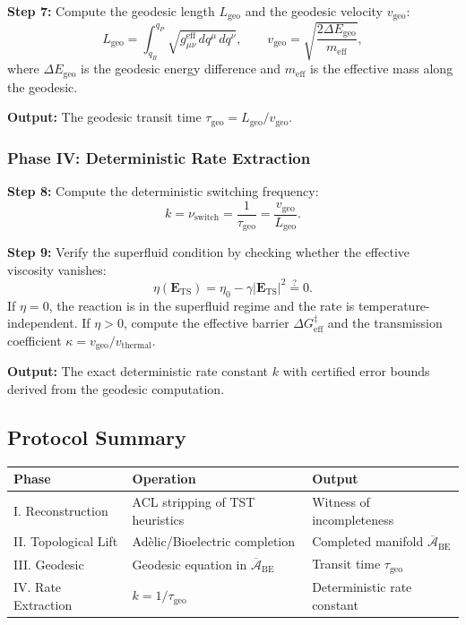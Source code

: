 \documentclass[11pt,openany]{extbook}
\theoremstyle{plain}
\theoremstyle{definition}
\begin{document}
\noindent \textbf{Step 7:} Compute the geodesic length $L_{\mathrm{geo}}$ and the geodesic velocity $v_{\mathrm{geo}}$:
\[
L_{\mathrm{geo}} = \int_{q_R}^{q_P} \sqrt{g_{\mu\nu}^{\mathrm{eff}} \, dq^\mu \, dq^\nu}, \qquad v_{\mathrm{geo}} = \sqrt{\frac{2 \Delta E_{\mathrm{geo}}}{m_{\mathrm{eff}}}},
\]
where $\Delta E_{\mathrm{geo}}$ is the geodesic energy difference and $m_{\mathrm{eff}}$ is the effective mass along the geodesic.

\noindent \textbf{Output:} The geodesic transit time $\tau_{\mathrm{geo}} = L_{\mathrm{geo}} / v_{\mathrm{geo}}$.

\subsubsection{Phase IV: Deterministic Rate Extraction}

\noindent \textbf{Step 8:} Compute the deterministic switching frequency:
\[
k = \nu_{\mathrm{switch}} = \frac{1}{\tau_{\mathrm{geo}}} = \frac{v_{\mathrm{geo}}}{L_{\mathrm{geo}}}.
\]

\noindent \textbf{Step 9:} Verify the superfluid condition by checking whether the effective viscosity vanishes:
\[
\eta(\mathbf{E}_{\mathrm{TS}}) = \eta_0 - \gamma|\mathbf{E}_{\mathrm{TS}}|^2 \stackrel{?}{=} 0.
\]
If $\eta = 0$, the reaction is in the superfluid regime and the rate is temperature-independent. If $\eta > 0$, compute the effective barrier $\Delta G^{\ddagger}_{\mathrm{eff}}$ and the transmission coefficient $\kappa = v_{\mathrm{geo}} / v_{\mathrm{thermal}}$.

\noindent \textbf{Output:} The exact deterministic rate constant $k$ with certified error bounds derived from the geodesic computation.

\subsection{Protocol Summary}

\begin{center}
\begin{tabular}{lll}
\toprule
\textbf{Phase} & \textbf{Operation} & \textbf{Output} \\
\midrule
I. Reconstruction & ACL stripping of TST heuristics & Witness of incompleteness \\
II. Topological Lift & Adèlic/Bioelectric completion & Completed manifold $\overline{\mathcal{A}}_{\mathrm{BE}}$ \\
III. Geodesic & Geodesic equation in $\overline{\mathcal{A}}_{\mathrm{BE}}$ & Transit time $\tau_{\mathrm{geo}}$ \\
IV. Rate Extraction & $k = 1/\tau_{\mathrm{geo}}$ & Deterministic rate constant \\
\bottomrule
\end{tabular}
\end{center}
\end{document}
